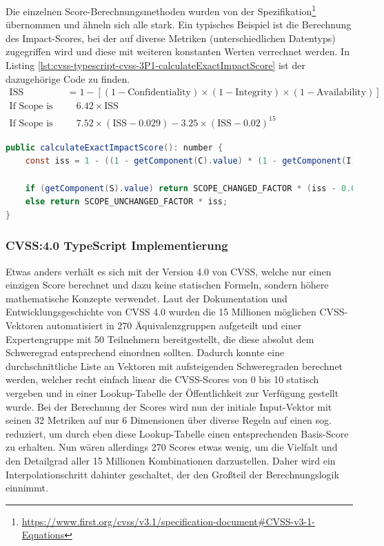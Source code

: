 Die einzelnen Score-Berechnungsmethoden wurden von der Spezifikation\footnote{\url{https://www.first.org/cvss/v3.1/specification-document\#CVSS-v3-1-Equations}} übernommen und ähneln sich alle stark.
Ein typisches Beispiel ist die Berechnung des Impact-Scores, bei der auf diverse Metriken (unterschiedlichen Datentyps) zugegriffen wird und diese mit weiteren konstanten Werten verrechnet werden.
In Listing \ref{lst:cvss-typescript-cvss-3P1-calculateExactImpactScore} ist der dazugehörige Code zu finden.
\begin{align*}
    \text{ISS} &= 1 - [ (1 - \text{Confidentiality}) \times (1 - \text{Integrity}) \times (1 - \text{Availability}) ] \\
    \text{If Scope is Unchanged:} & \quad 6.42 \times \text{ISS} \\
    \text{If Scope is Changed:} & \quad 7.52 \times (\text{ISS} - 0.029) - 3.25 \times (\text{ISS} - 0.02)^{15}
\end{align*}

\begin{lstlisting}[language=Java, label={lst:cvss-typescript-cvss-3P1-calculateExactImpactScore}, caption={CVSS 3.1 Impact Score-Berechnung in TypeScript}, basicstyle=\scriptsize]
public calculateExactImpactScore(): number {
    const iss = 1 - ((1 - getComponent(C).value) * (1 - getComponent(I).value) * (1 - getComponent(A).value));

    if (getComponent(S).value) return SCOPE_CHANGED_FACTOR * (iss - 0.029) - 3.25 * Math.pow(iss - 0.02, 15);
    else return SCOPE_UNCHANGED_FACTOR * iss;
}
\end{lstlisting}

\subsubsection{CVSS:4.0 TypeScript Implementierung} \label{subsec:projektbericht-loesungsweg-typescript-cvss-online-calculator-cvss-4P0}

Etwas anders verhält es sich mit der Version 4.0 von CVSS, welche nur einen einzigen Score berechnet und dazu keine statischen Formeln, sondern höhere mathematische Konzepte verwendet.
Laut der Dokumentation und Entwicklungsgeschichte von CVSS 4.0 \cite{CVSSv4.0Specification} wurden die 15 Millionen möglichen CVSS-Vektoren automatisiert in 270 Äquivalenzgruppen aufgeteilt und einer Expertengruppe mit 50 Teilnehmern bereitgestellt, die diese absolut dem Schweregrad entsprechend einordnen sollten.
Dadurch konnte eine durchschnittliche Liste an Vektoren mit aufsteigenden Schweregraden berechnet werden, welcher recht einfach linear die CVSS-Scores von 0 bis 10 statisch vergeben und in einer Lookup-Tabelle der Öffentlichkeit zur Verfügung gestellt wurde.
Bei der Berechnung der Scores wird nun der initiale Input-Vektor mit seinen 32 Metriken auf nur 6 Dimensionen über diverse Regeln auf einen sog.  reduziert, um durch eben diese Lookup-Tabelle einen entsprechenden Basis-Score zu erhalten.
Nun wären allerdings 270 Scores etwas wenig, um die Vielfalt und den Detailgrad aller 15 Millionen Kombinationen darzustellen.
Daher wird ein Interpolationschritt dahinter geschaltet, der den Großteil der Berechnungslogik einnimmt.

